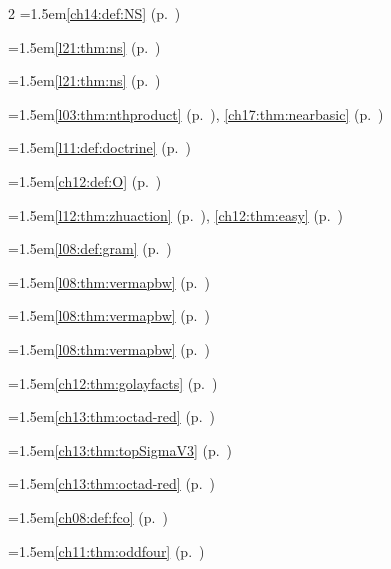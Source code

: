 \begin{multicols}{2}
\hangindent=1.5em\quad \ref{ch14:def:NS} (p.~\pageref{ch14:def:NS})\par
\hangindent=1.5em\quad \ref{l21:thm:ns} (p.~\pageref{l21:thm:ns})\par
\hangindent=1.5em\quad \ref{l21:thm:ns} (p.~\pageref{l21:thm:ns})\par
\hangindent=1.5em\quad \ref{l03:thm:nthproduct} (p.~\pageref{l03:thm:nthproduct}), \ref{ch17:thm:nearbasic} (p.~\pageref{ch17:thm:nearbasic})\par
\hangindent=1.5em\quad \ref{l11:def:doctrine} (p.~\pageref{l11:def:doctrine})\par
\par{}\par\nopagebreak\smallskip
\hangindent=1.5em\quad \ref{ch12:def:O} (p.~\pageref{ch12:def:O})\par
\hangindent=1.5em\quad \ref{l12:thm:zhuaction} (p.~\pageref{l12:thm:zhuaction}), \ref{ch12:thm:easy} (p.~\pageref{ch12:thm:easy})\par
\hangindent=1.5em\quad \ref{l08:def:gram} (p.~\pageref{l08:def:gram})\par
\hangindent=1.5em\quad \ref{l08:thm:vermapbw} (p.~\pageref{l08:thm:vermapbw})\par
\hangindent=1.5em\quad \ref{l08:thm:vermapbw} (p.~\pageref{l08:thm:vermapbw})\par
\hangindent=1.5em\quad \ref{l08:thm:vermapbw} (p.~\pageref{l08:thm:vermapbw})\par
\hangindent=1.5em\quad \ref{ch12:thm:golayfacts} (p.~\pageref{ch12:thm:golayfacts})\par
\hangindent=1.5em\quad \ref{ch13:thm:octad-red} (p.~\pageref{ch13:thm:octad-red})\par
\hangindent=1.5em\quad \ref{ch13:thm:topSigmaV3} (p.~\pageref{ch13:thm:topSigmaV3})\par
\hangindent=1.5em\quad \ref{ch13:thm:octad-red} (p.~\pageref{ch13:thm:octad-red})\par
\hangindent=1.5em\quad \ref{ch08:def:fco} (p.~\pageref{ch08:def:fco})\par
\hangindent=1.5em\quad \ref{ch11:thm:oddfour} (p.~\pageref{ch11:thm:oddfour})\par

\end{multicols}
